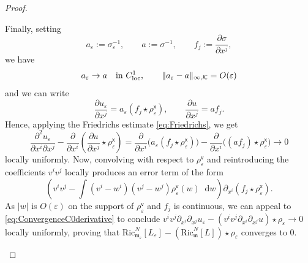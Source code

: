 \documentclass[a4paper,11pt]{article}
\numberwithin{equation}{section}
\theoremstyle{definition}
\theoremstyle{plain}
\newcommand{\eps}{\varepsilon}
\newcommand{\Ric}{\mathrm{Ric}}
\newcommand{\m}{\mathfrak m}
\newcommand*\diff{\mathop{}\!\mathrm{d}}
\newcommand{\loc}{\mathrm{loc}}
\begin{document}
\begin{proof}
\begin{enumerate}
Finally, setting
\begin{equation*}
    a_\eps:= \sigma_\eps^{-1}, \qquad a:= \sigma^{-1}, \qquad f_j:= \frac{\partial \sigma}{\partial x^j},
\end{equation*}
we have 
\begin{equation*}
    a_\eps \rightarrow a \quad \textnormal{in}\ C^{1}_\loc, \qquad \|a_\eps - a\|_{\infty, \mathcal K} = O(\eps)
\end{equation*}
and we can write
\begin{equation*}
    \frac{\partial u_\eps}{\partial x^j} = a_\eps (f_j \star \rho_\eps^{\mathsf x}), \qquad \frac{\partial u}{\partial x^j} = a f_j.
\end{equation*}
Hence, applying the Friedrichs estimate \eqref{eq:Friedrichs}, we get
\begin{equation*}
    \frac{\partial^2 u_\eps}{\partial x^i \partial x^j} - \frac{\partial}{\partial x^i}\left( \frac{\partial u}{\partial x^j} \star \rho_\eps^{\mathsf x}\right) = \frac{\partial}{\partial x^i}\bigl(a_\eps (f_j \star \rho_\eps^{\mathsf x})\bigr) - \frac{\partial}{\partial x^i}\bigl((af_j) \star \rho_\eps^{\mathsf x}\bigr) \rightarrow 0
\end{equation*}
locally uniformly.
Now, convolving with respect to $\rho_\eps^{\mathsf v}$ and reintroducing the coefficients $v^iv^j$ locally produces an error term of the form
\begin{equation*}
    \left(v^iv^j-\int(v^i-w^i)(v^j-w^j) \rho_\eps^{\mathsf v}(w) \diff w \right)\partial_{x^i}(f_j \star \rho_\eps^{\mathsf x}).
\end{equation*}
As $|w|$ is $O(\eps)$ on the support of $\rho_\eps^{\mathsf v}$ and $f_j$ is continuous, we can appeal to \eqref{eq:ConvergenceC0derivative} to conclude $v^iv^j \partial_{x^i}\partial_{x^j} u_\eps - (v^iv^j \partial_{x^i}\partial_{x^j} u)\star \rho_\eps \rightarrow 0$ locally uniformly, proving that $\Ric_{\m_\eps}^N[L_\eps] - (\Ric_{\m}^N[L])\star \rho_\eps$ converges to $0$.


\end{enumerate}
\end{proof}
\end{document}

